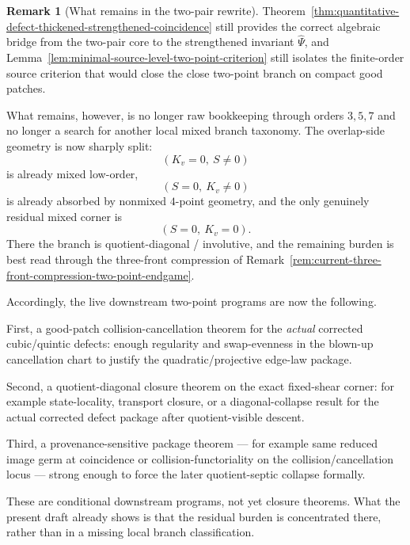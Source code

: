 \documentclass[11pt,a4paper]{amsart}
\theoremstyle{plain}
\theoremstyle{definition}
\newtheorem{remark}[theorem]{Remark}
\begin{document}
\begin{remark}[What remains in the two-pair rewrite]
\label{rem:what-remains-two-pair-rewrite}
Theorem~\ref{thm:quantitative-defect-thickened-strengthened-coincidence}
still provides the correct algebraic bridge from the two-pair core to the
strengthened invariant $\widehat\Psi$, and
Lemma~\ref{lem:minimal-source-level-two-point-criterion}
still isolates the finite-order source criterion that would close the close
two-point branch on compact good patches.

What remains, however, is no longer raw bookkeeping through orders $3,5,7$ and
no longer a search for another local mixed branch taxonomy. The overlap-side
geometry is now sharply split:
\[
(K_v=0,\ S\neq 0)
\]
is already mixed low-order,
\[
(S=0,\ K_v\neq 0)
\]
is already absorbed by nonmixed $4$-point geometry,
and the only genuinely residual mixed corner is
\[
(S=0,\ K_v=0).
\]
There the branch is quotient-diagonal / involutive, and the remaining burden is
best read through the three-front compression of
Remark~\ref{rem:current-three-front-compression-two-point-endgame}.

Accordingly, the live downstream two-point programs are now the following.

First, a good-patch collision-cancellation theorem for the \emph{actual}
corrected cubic/quintic defects: enough regularity and swap-evenness in the
blown-up cancellation chart to justify the quadratic/projective edge-law
package.

Second, a quotient-diagonal closure theorem on the exact fixed-shear corner:
for example state-locality, transport closure, or a diagonal-collapse result
for the actual corrected defect package after quotient-visible descent.

Third, a provenance-sensitive package theorem --- for example same reduced
image germ at coincidence or collision-functoriality on the
collision/cancellation locus --- strong enough to force the later
quotient-septic collapse formally.

These are conditional downstream programs, not yet closure theorems. What the
present draft already shows is that the residual burden is concentrated there,
rather than in a missing local branch classification.
\end{remark}
\end{document}
